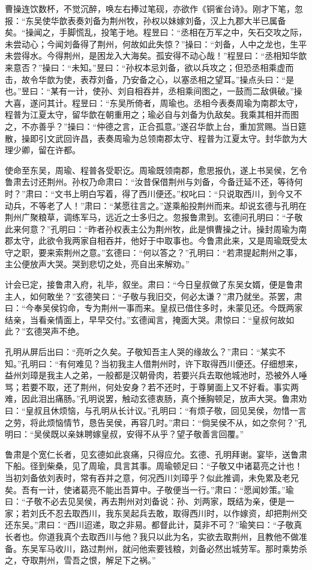曹操连饮数杯，不觉沉醉，唤左右捧过笔砚，亦欲作《铜雀台诗》。刚才下笔，忽报：“东吴使华歆表奏刘备为荆州牧，孙权以妹嫁刘备，汉上九郡大半已属备矣。“操闻之，手脚慌乱，投笔于地。程昱曰：“丞相在万军之中，矢石交攻之际，未尝动心；今闻刘备得了荆州，何故如此失惊？”操曰：“刘备，人中之龙也，生平未尝得水。今得荆州，是困龙入大海矣。孤安得不动心哉！”程昱曰：“丞相知华歆来意否？”操曰：“未知。”昱曰：“孙权本忌刘备，欲以兵攻之；但恐丞相乘虚而击，故令华歆为使，表荐刘备，乃安备之心，以塞丞相之望耳。”操点头曰：“是也。”昱曰：“某有一计，使孙、刘自相吞并，丞相乘间图之，一鼓而二敌俱破。”操大喜，遂问其计。程昱曰：“东吴所倚者，周瑜也。丞相今表奏周瑜为南郡太守，程普为江夏太守，留华歆在朝重用之；瑜必自与刘备为仇敌矣。我乘其相并而图之，不亦善乎？”操曰：“仲德之言，正合孤意。”遂召华歆上台，重加赏赐。当日筵散，操即引文武回许昌，表奏周瑜为总领南郡太守、程普为江夏太守。封华歆为大理少卿，留在许都。

使命至东吴，周瑜、程普各受职讫。周瑜既领南郡，愈思报仇，遂上书吴侯，乞令鲁肃去讨还荆州。孙权乃命肃曰：“汝昔保借荆州与刘备，今备迁延不还，等待何时？”肃曰：“文书上明白写着，得了西川便还。”权叱曰：“只说取西川，到今又不动兵，不等老了人！”肃曰：“某愿往言之。”遂乘船投荆州而来。却说玄德与孔明在荆州广聚粮草，调练军马，远近之士多归之。忽报鲁肃到。玄德问孔明曰：“子敬此来何意？”孔明曰：“昨者孙权表主公为荆州牧，此是惧曹操之计。操封周瑜为南郡太守，此欲令我两家自相吞并，他好于中取事也。今鲁肃此来，又是周瑜既受太守之职，要来索荆州之意。”玄德曰：“何以答之？”孔明曰：“若肃提起荆州之事，主公便放声大哭。哭到悲切之处，亮自出来解劝。”

计会已定，接鲁肃入府，礼毕，叙坐。肃曰：“今日皇叔做了东吴女婿，便是鲁肃主人，如何敢坐？”玄德笑曰：“子敬与我旧交，何必太谦？”肃乃就坐。茶罢，肃曰：“今奉吴侯钧命，专为荆州一事而来。皇叔已借住多时，未蒙见还。今既两家结亲，当看亲情面上，早早交付。”玄德闻言，掩面大哭。肃惊曰：“皇叔何故如此？”玄德哭声不绝。

孔明从屏后出曰：“亮听之久矣。子敬知吾主人哭的缘故么？”肃曰：“某实不知。”孔明曰：“有何难见？当初我主人借荆州时，许下取得西川便还。仔细想来，益州刘璋是我主人之弟，一般都是汉朝骨肉，若要兴兵去取他城池时，恐被外人唾骂；若要不取，还了荆州，何处安身？若不还时，于尊舅面上又不好看。事实两难，因此泪出痛肠。”孔明说罢，触动玄德衷肠，真个捶胸顿足，放声大哭。鲁肃劝曰：“皇叔且休烦恼，与孔明从长计议。”孔明曰：“有烦子敬，回见吴侯，勿惜一言之劳，将此烦恼情节，恳告吴侯，再容几时。”肃曰：“倘吴侯不从，如之奈何？”孔明曰：“吴侯既以亲妹聘嫁皇叔，安得不从乎？望子敬善言回覆。”

鲁肃是个宽仁长者，见玄德如此哀痛，只得应允。玄德、孔明拜谢。宴毕，送鲁肃下船。径到柴桑，见了周瑜，具言其事。周瑜顿足曰：“子敬又中诸葛亮之计也！当初刘备依刘表时，常有吞并之意，何况西川刘璋乎？似此推调，未免累及老兄矣。吾有一计，使诸葛亮不能出吾算中。子敬便当一行。”肃曰：“愿闻妙策。”瑜曰：“子敬不必去见吴侯，再去荆州对刘备说：孙、刘两家，既结为亲，便是一家；若刘氏不忍去取西川，我东吴起兵去敢，取得西川时，以作嫁资，却把荆州交还东吴。”肃曰：“西川迢递，取之非易。都督此计，莫非不可？”瑜笑曰：“子敬真长者也。你道我真个去取西川与他？我只以此为名，实欲去取荆州，且教他不做准备。东吴军马收川，路过荆州，就问他索要钱粮，刘备必然出城劳军。那时乘势杀之，夺取荆州，雪吾之恨，解足下之祸。”


